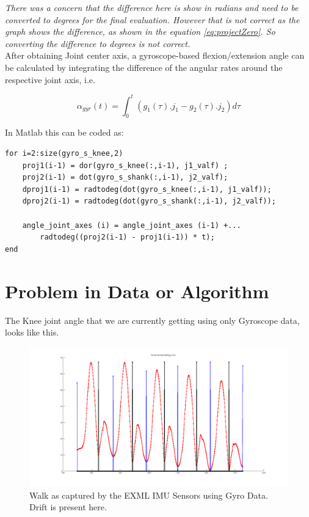 \documentclass[12pt]{article}
\begin{document}
\textit{There was a concern that the difference here is show in radians and need to be converted to degrees for the final evaluation. However that is not correct as the graph shows the difference, as shown in the equation \ref{eq:projectZero}. So converting the difference to degrees is not correct.}\\

After obtaining Joint center axis, a gyroscope-based flexion/extension angle can be calculated by integrating the difference of the angular rates around the respective joint axis, i.e.

\begin{equation}
\alpha_{gyr}(t) = \int_0^t(g_1(\tau).j_1 - g_2(\tau).j_2)d\tau
\end{equation}

In Matlab this can be coded as:\\

\begin{verbatim}
for i=2:size(gyro_s_knee,2)
    proj1(i-1) = dor(gyro_s_knee(:,i-1), j1_valf) ;
    proj2(i-1) = dot(gyro_s_shank(:,i-1), j2_valf);
    dproj1(i-1) = radtodeg(dot(gyro_s_knee(:,i-1), j1_valf));
    dproj2(i-1) = radtodeg(dot(gyro_s_shank(:,i-1), j2_valf));
    
    angle_joint_axes (i) = angle_joint_axes (i-1) +...
        radtodeg((proj2(i-1) - proj1(i-1)) * t);
end
\end{verbatim}




\newpage
\section*{Problem in Data or Algorithm}

The Knee joint angle that we are currently getting using only Gyroscope data, looks like this.
\begin{figure}[!htb]
\includegraphics[scale=.3,center]{driftSteps.png}
\caption{Walk as captured by the EXML IMU Sensors using Gyro Data. Drift is present here.}
\label{diffproject}
\end{figure}
\end{document}

